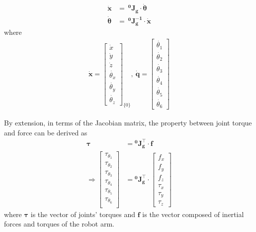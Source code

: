 \begin{equation}
\label{eq:jg0}
\begin{split}
\boldsymbol{\dot{x}} &= \ \mathbf{^0\!J_g} \cdot \boldsymbol{\dot{\theta}} 		\\ 
\boldsymbol{\dot{\theta}} &= \ \mathbf{^0\!J_g^{-1}} \cdot \boldsymbol{\dot{x}}
\end{split}
\end{equation}
where
\begin{equation*}
\begin{split}
\boldsymbol{\dot{x}}
=
\begin{bmatrix}
\dot{x}\\
\dot{y}\\
\dot{z}\\
\dot{\theta _x}\\
\dot{\theta _y}\\
\dot{\theta _z}
\end{bmatrix}_{\!\{0\}}
,\ 
\boldsymbol{\dot{q}}
=
\begin{bmatrix}
\dot{\theta _1} \\ 
\dot{\theta _2} \\ 
\dot{\theta _3} \\ 
\dot{\theta _4} \\ 
\dot{\theta _5} \\ 
\dot{\theta _6} 
\end{bmatrix}
\end{split}
\end{equation*}
\par
By extension, in terms of the Jacobian matrix, the property between joint torque and force can be derived as
\begin{equation}
\begin{split}
\boldsymbol{\tau } &= \mathbf{^0\!J^\top _g} \cdot \boldsymbol{f}	\\
\Rightarrow
\begin{bmatrix}
\tau_{\theta _1} \\ 
\tau_{\theta _2} \\ 
\tau_{\theta _3} \\ 
\tau_{\theta _4} \\ 
\tau_{\theta _5} \\ 
\tau_{\theta _6} \\ 
\end{bmatrix}
&=
\mathbf{^0\!J^\top _g} 
\cdot
\begin{bmatrix}
f_x \\ 
f_y \\ 
f_z \\ 
\tau_{x} \\ 
\tau_{y} \\ 
\tau_{z}
\end{bmatrix}
\end{split}
\end{equation}
where $\boldsymbol{\tau }$ is the vector of joints' torques and $\boldsymbol{f}$ is the vector composed of inertial forces and torques of the robot arm.

